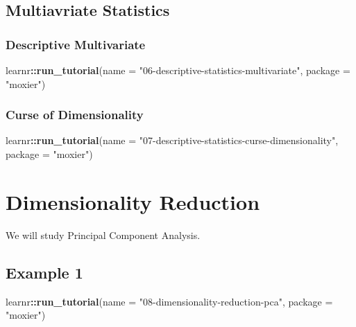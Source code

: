 \documentclass[]{book}
\newenvironment{Shaded}{\begin{snugshade}}{\end{snugshade}}
\newcommand{\KeywordTok}[1]{\textcolor[rgb]{0.13,0.29,0.53}{\textbf{#1}}}
\newcommand{\DataTypeTok}[1]{\textcolor[rgb]{0.13,0.29,0.53}{#1}}
\newcommand{\StringTok}[1]{\textcolor[rgb]{0.31,0.60,0.02}{#1}}
\newcommand{\OperatorTok}[1]{\textcolor[rgb]{0.81,0.36,0.00}{\textbf{#1}}}
\newcommand{\NormalTok}[1]{#1}
\begin{document}
\section{Multiavriate Statistics}\label{multiavriate-statistics}

\subsection{Descriptive Multivariate}\label{descriptive-multivariate}

\begin{Shaded}
\begin{Highlighting}[]
\NormalTok{learnr}\OperatorTok{::}\KeywordTok{run_tutorial}\NormalTok{(}\DataTypeTok{name =} \StringTok{"06-descriptive-statistics-multivariate"}\NormalTok{,}
                     \DataTypeTok{package =} \StringTok{"moxier"}\NormalTok{)}
\end{Highlighting}
\end{Shaded}

\subsection{Curse of Dimensionality}\label{curse-of-dimensionality}

\begin{Shaded}
\begin{Highlighting}[]
\NormalTok{learnr}\OperatorTok{::}\KeywordTok{run_tutorial}\NormalTok{(}\DataTypeTok{name =} \StringTok{"07-descriptive-statistics-curse-dimensionality"}\NormalTok{,}
                     \DataTypeTok{package =} \StringTok{"moxier"}\NormalTok{)}
\end{Highlighting}
\end{Shaded}

\chapter{Dimensionality Reduction}\label{dimensionality-reduction}

We will study Principal Component Analysis.

\section{Example 1}\label{example-1}

\begin{Shaded}
\begin{Highlighting}[]
\NormalTok{learnr}\OperatorTok{::}\KeywordTok{run_tutorial}\NormalTok{(}\DataTypeTok{name =} \StringTok{"08-dimensionality-reduction-pca"}\NormalTok{,}
                     \DataTypeTok{package =} \StringTok{"moxier"}\NormalTok{)}
\end{Highlighting}
\end{Shaded}
\end{document}
